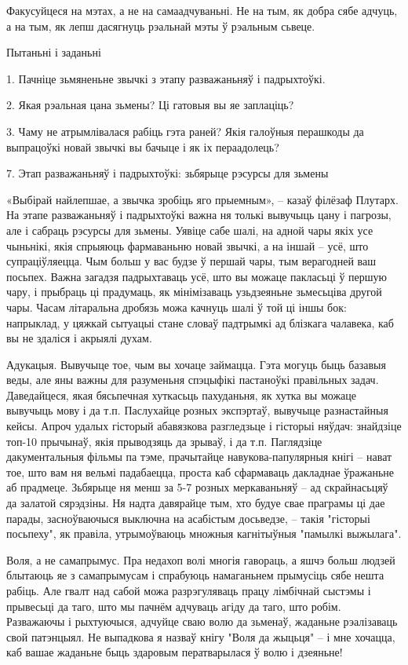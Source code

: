 Факусуйцеся на мэтах, а не на самаадчуваньні. Не на тым, як добра сябе адчуць, а на тым, як лепш дасягнуць рэальнай мэты ў рэальным сьвеце.

Пытаньні і заданьні

1. Пачніце зьмяненьне звычкі з этапу разважаньняў і падрыхтоўкі.

2. Якая рэальная цана зьмены? Ці гатовыя вы яе заплаціць?

3. Чаму не атрымлівалася рабіць гэта раней? Якія галоўныя перашкоды да выпрацоўкі новай звычкі вы бачыце і як іх пераадолець?


7. Этап разважаньняў і падрыхтоўкі: зьбярыце рэсурсы для зьмены

«Выбірай найлепшае, а звычка зробіць яго прыемным», – казаў філёзаф Плутарх. На этапе разважаньняў і падрыхтоўкі важна ня толькі вывучыць цану і пагрозы, але і сабраць рэсурсы для зьмены. Уявіце сабе шалі, на адной чары якіх усе чыньнікі, якія спрыяюць фармаваньню новай звычкі, а на іншай – усё, што супраціўляецца. Чым больш у вас будзе ў першай чары, тым верагодней ваш посьпех. Важна загадзя падрыхтаваць усё, што вы можаце пакласьці ў першую чару, і прыбраць ці прадумаць, як мінімізаваць узьдзеяньне зьмесьціва другой чары. Часам літаральна дробязь можа качнуць шалі ў той ці іншы бок: напрыклад, у цяжкай сытуацыі стане словаў падтрымкі ад блізкага чалавека, каб вы не здаліся і акрыялі духам.

Адукацыя. Вывучыце тое, чым вы хочаце займацца. Гэта могуць быць базавыя веды, але яны важны для разуменьня спэцыфікі пастаноўкі правільных задач. Даведайцеся, якая бясьпечная хуткасьць пахуданьня, як хутка вы можаце вывучыць мову і да т.п. Паслухайце розных экспэртаў, вывучыце разнастайныя кейсы. Апроч удалых гісторый абавязкова разгледзьце і гісторыі няўдач: знайдзіце топ-10 прычынаў, якія прыводзяць да зрываў, і да т.п. Паглядзіце дакументальныя фільмы па тэме, прачытайце навукова-папулярныя кнігі – нават тое, што вам ня вельмі падабаецца, проста каб сфармаваць дакладнае ўражаньне аб прадмеце. Зьбярыце ня менш за 5-7 розных меркаваньняў – ад скрайнасьцяў да залатой сярэдзіны. Ня надта давярайце тым, хто будуе свае праграмы ці дае парады, засноўваючыся выключна на асабістым досьведзе, – такія "гісторыі посьпеху", як правіла, утрымоўваюць множныя кагнітыўныя "памылкі выжылага".

Воля, а не самапрымус. Пра недахоп волі многія гавораць, а яшчэ больш людзей блытаюць яе з самапрымусам і спрабуюць намаганьнем прымусіць сябе нешта рабіць. Але гвалт над сабой можа разрэгуляваць працу лімбічнай сыстэмы і прывесьці да таго, што мы пачнём адчуваць агіду да таго, што робім. Разважаючы і рыхтуючыся, адчуйце сваю волю да зьменаў, жаданьне рэалізаваць свой патэнцыял. Не выпадкова я назваў кнігу "Воля да жыцьця" – і мне хочацца, каб вашае жаданьне быць здаровым ператварылася ў волю і дзеяньне!

